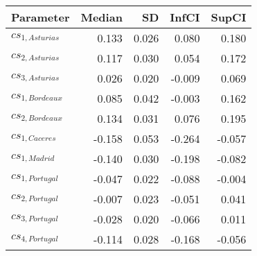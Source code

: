\begin{table}[ht]
\centering
\begin{tabular}{lrrrr}
  \hline
Parameter & Median & SD & InfCI & SupCI \\ 
  \hline
$cs_{1,Asturias}$ & 0.133 & 0.026 & 0.080 & 0.180 \\ 
  $cs_{2,Asturias}$ & 0.117 & 0.030 & 0.054 & 0.172 \\ 
  $cs_{3,Asturias}$ & 0.026 & 0.020 & -0.009 & 0.069 \\ 
  $cs_{1,Bordeaux}$ & 0.085 & 0.042 & -0.003 & 0.162 \\ 
  $cs_{2,Bordeaux}$ & 0.134 & 0.031 & 0.076 & 0.195 \\ 
  $cs_{1,Caceres}$ & -0.158 & 0.053 & -0.264 & -0.057 \\ 
  $cs_{1,Madrid}$ & -0.140 & 0.030 & -0.198 & -0.082 \\ 
  $cs_{1,Portugal}$ & -0.047 & 0.022 & -0.088 & -0.004 \\ 
  $cs_{2,Portugal}$ & -0.007 & 0.023 & -0.051 & 0.041 \\ 
  $cs_{3,Portugal}$ & -0.028 & 0.020 & -0.066 & 0.011 \\ 
  $cs_{4,Portugal}$ & -0.114 & 0.028 & -0.168 & -0.056 \\ 
   \hline
\end{tabular}
\end{table}
